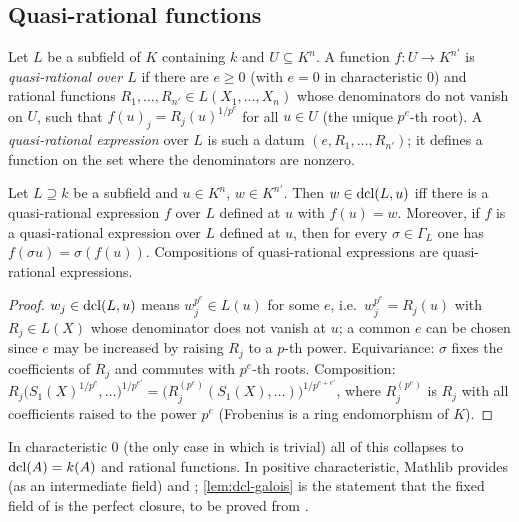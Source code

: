 \subsection{Quasi-rational functions}

\begin{definition}\label{def:qr}
Let $L$ be a subfield of $K$ containing $k$ and $U\subseteq K^n$.  A function
$f:U\to K^{n'}$ is \emph{quasi-rational over $L$} if there are $e\ge0$ (with $e=0$ in
characteristic $0$) and rational functions $R_1,\dots,R_{n'}\in L(X_1,\dots,X_n)$ whose
denominators do not vanish on $U$, such that $f(u)_j=R_j(u)^{1/p^e}$ for all $u\in U$
(the unique $p^e$-th root).  A \emph{quasi-rational expression} over $L$ is such a datum
$(e,R_1,\dots,R_{n'})$; it defines a function on the set where the denominators are
nonzero.
\end{definition}

\begin{lemma}\label{lem:qr-dcl}
Let $L\supseteq k$ be a subfield and $u\in K^n$, $w\in K^{n'}$.  Then $w\in\operatorname{dcl}(L,u)$
iff there is a quasi-rational expression $f$ over $L$ defined at $u$ with $f(u)=w$.
Moreover, if $f$ is a quasi-rational expression over $L$ defined at $u$, then for
every $\sigma\in\Gamma_L$ one has $f(\sigma u)=\sigma(f(u))$.  Compositions of
quasi-rational expressions are quasi-rational expressions.
\end{lemma}
\begin{proof}
$w_j\in\operatorname{dcl}(L,u)$ means $w_j^{p^e}\in L(u)$ for some $e$, i.e.\ $w_j^{p^e}=R_j(u)$
with $R_j\in L(X)$ whose denominator does not vanish at $u$; a common $e$ can be
chosen since $e$ may be increased by raising $R_j$ to a $p$-th power.  Equivariance:
$\sigma$ fixes the coefficients of $R_j$ and commutes with $p^e$-th roots.
Composition: $R_j\bigl(S_1(X)^{1/p^e},\dots\bigr)^{1/p^{e'}}
=\bigl(R_j^{(p^e)}(S_1(X),\dots)\bigr)^{1/p^{e+e'}}$, where $R_j^{(p^e)}$ is $R_j$ with all
coefficients raised to the power $p^e$ (Frobenius is a ring endomorphism of $K$).
\end{proof}

\begin{leannote}
In characteristic $0$ (the only case in which  is trivial) all of
this collapses to $\operatorname{dcl}(A)=k(A)$ and rational functions.  In positive characteristic,
Mathlib provides  (as an intermediate field) and
; \cref{lem:dcl-galois} is the statement that the fixed
field of  is the perfect closure, to be proved from
.
\end{leannote}

